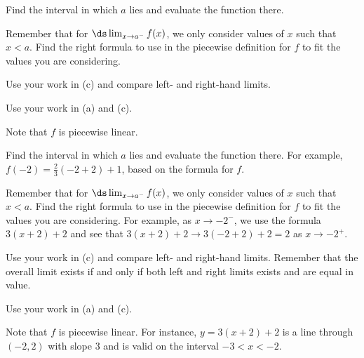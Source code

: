 \begin{smallhint}
\ba
	\item Find the interval in which $a$ lies and evaluate the function there.
	\item Remember that for $\ds \lim_{x \to a^-} f(x)$, we only consider values of $x$ such that $x < a$.  Find the right formula to use in the piecewise definition for $f$ to fit the values you are considering.
	\item Use your work in (c) and compare left- and right-hand limits.
	\item Use your work in (a) and (c).
	\item Note that $f$ is piecewise linear.  
\ea
\end{smallhint}
\begin{bighint}
\ba
	\item Find the interval in which $a$ lies and evaluate the function there.  For example, $f(-2) = \frac{2}{3}(-2+2) + 1$, based on the formula for $f$.
	\item Remember that for $\ds \lim_{x \to a^-} f(x)$, we only consider values of $x$ such that $x < a$.  Find the right formula to use in the piecewise definition for $f$ to fit the values you are considering.  For example, as $x \to -2^-$, we use the formula $3(x+2)+2$ and see that $3(x+2)+2 \to 3(-2+2)+2 = 2$ as $x \to -2^+$.
	\item Use your work in (c) and compare left- and right-hand limits.  Remember that the overall limit exists if and only if both left and right limits exists and are equal in value.
	\item Use your work in (a) and (c).
	\item Note that $f$ is piecewise linear.  For instance, $y = 3(x+2) + 2$ is a line through $(-2,2)$ with slope 3 and is valid on the interval $-3 < x < -2$.
\ea\end{bighint}
